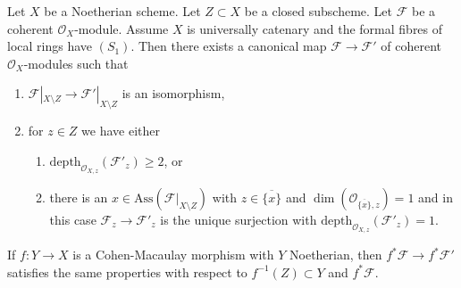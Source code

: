\begin{lemma}
\label{lemma-make-S2-along-Z}
Let $X$ be a Noetherian scheme. Let $Z \subset X$ be a closed subscheme.
Let $\mathcal{F}$ be a coherent $\mathcal{O}_X$-module. Assume
$X$ is universally catenary and the formal fibres of
local rings have $(S_1)$.
Then there exists a canonical map $\mathcal{F} \to \mathcal{F}'$
of coherent $\mathcal{O}_X$-modules such that
\begin{enumerate}
\item $\mathcal{F}|_{X \setminus Z} \to \mathcal{F}'|_{X \setminus Z}$
is an isomorphism,
\item for $z \in Z$ we have either
\begin{enumerate}
\item $\text{depth}_{\mathcal{O}_{X, z}}(\mathcal{F}'_z) \geq 2$, or
\item there is an $x \in \text{Ass}(\mathcal{F}|_{X \setminus Z})$
with $z \in \overline{\{x\}}$ and
$\dim(\mathcal{O}_{\overline{\{x\}}, z}) = 1$
and in this case $\mathcal{F}_z \to \mathcal{F}'_z$ is the unique
surjection with $\text{depth}_{\mathcal{O}_{X, z}}(\mathcal{F}'_z) = 1$.
\end{enumerate}
\end{enumerate}
If $f : Y \to X$ is a Cohen-Macaulay morphism with $Y$ Noetherian,
then $f^*\mathcal{F} \to f^*\mathcal{F}'$ satisfies the same properties
with respect to $f^{-1}(Z) \subset Y$ and $f^*\mathcal{F}$.
\end{lemma}

